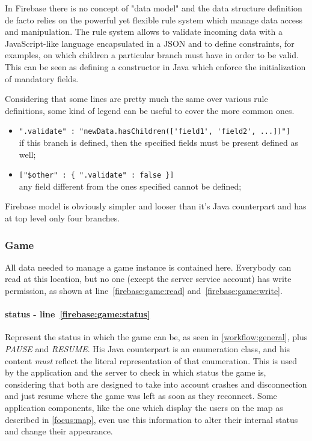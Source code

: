 			In Firebase there is no concept of "data model" and the data structure definition de facto relies on the powerful yet flexible rule system which manage data access and manipulation.
			The rule system allows to validate incoming data with a JavaScript-like language encapsulated in a JSON and to define constraints, for examples, on which children a particular branch must have in order to be valid. This can be seen as defining a constructor in Java which enforce the initialization of mandatory fields.
			
			Considering that some lines are pretty much the same over various rule definitions, some kind of legend can be useful to cover the more common ones.
			
			\begin{itemize}
				\item \lstinline|".validate" : "newData.hasChildren(['field1', 'field2', ...])"]| \\ if this branch is defined, then the specified fields must be present defined as well;
				\item \lstinline|["$other" : { ".validate" : false }]| \\ any field different from the ones specified cannot be defined;
			\end{itemize}
			
			Firebase model is obviously simpler and looser than it's Java counterpart and has at top level only four branches.
			
			
			\subsubsection{Game}
			
				
				
				All data needed to manage a game instance is contained here.
				Everybody can read at this location, but no one (except the server service account) has write permission, as shown at line~\ref{firebase:game:read} and~\ref{firebase:game:write}.
				
				\paragraph{status - line~\ref{firebase:game:status}}
				Represent the status in which the game can be, as seen in \autoref{workflow:general}, plus \emph{PAUSE} and \emph{RESUME}.
				His Java counterpart is an enumeration class, and his content \emph{must} reflect the literal representation of that enumeration.
				This is used by the application and the server to check in which status the game is, considering that both are designed to take into account crashes and disconnection and just resume where the game was left as soon as they reconnect.
				Some application components, like the one which display the users on the map as described in \autoref{focus:map}, even use this information to alter their internal status and change their appearance.
				
